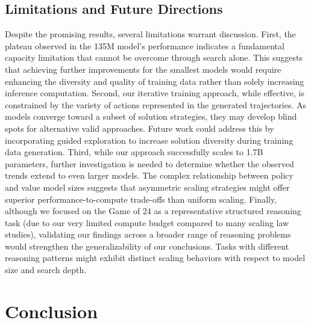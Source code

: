 \documentclass{article}
\begin{document}
\subsection{Limitations and Future Directions}

Despite the promising results, several limitations warrant discussion. First, the plateau observed in the 135M model's performance indicates a fundamental capacity limitation that cannot be overcome through search alone. This suggests that achieving further improvements for the smallest models would require enhancing the diversity and quality of training data rather than solely increasing inference computation. Second, our iterative training approach, while effective, is constrained by the variety of actions represented in the generated trajectories. As models converge toward a subset of solution strategies, they may develop blind spots for alternative valid approaches. Future work could address this by incorporating guided exploration to increase solution diversity during training data generation. Third, while our approach successfully scales to 1.7B parameters, further investigation is needed to determine whether the observed trends extend to even larger models. The complex relationship between policy and value model sizes suggests that asymmetric scaling strategies might offer superior performance-to-compute trade-offs than uniform scaling. Finally, although we focused on the Game of 24 as a representative structured reasoning task (due to our very limited compute budget compared to many scaling law studies), validating our findings across a broader range of reasoning problems would strengthen the generalizability of our conclusions. Tasks with different reasoning patterns might exhibit distinct scaling behaviors with respect to model size and search depth.

\section{Conclusion}
\end{document}
